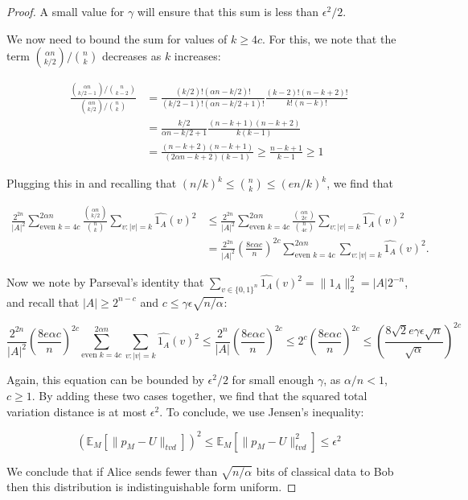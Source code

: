 \documentclass[a4paper]{article}
\begin{document}
\begin{proof}
        A small value for $\gamma$ will ensure that this sum is less than $\epsilon^2/2$.

        We now need to bound the sum for values of $k \geq 4c$. For this, we note that the term $\binom{\alpha n}{k/2}/\binom{n}{k}$ decreases as $k$ increases:

        \begin{align*}
            \frac{\binom{\alpha n}{k/2 - 1}/\binom{n}{k-2}}{\binom{\alpha n}{k/2}/\binom{n}{k}} &= \frac{(k/2)!(\alpha n - k/2)!}{(k/2 - 1)!(\alpha n - k/2 + 1)!}\frac{(k-2)!(n-k + 2)!}{k!(n-k)!}\\
            &= \frac{k/2}{\alpha n - k/2 + 1}\frac{(n - k + 1)(n - k + 2)}{k(k - 1)}\\
            &= \frac{(n - k + 2)(n - k + 1)}{(2\alpha n - k + 2)(k - 1)} \geq \frac{n - k + 1}{k - 1} \geq 1
        \end{align*}

        Plugging this in and recalling that $(n/k)^k \leq \binom{n}{k} \leq (en/k)^k$, we find that

        \begin{align*}
            \frac{2^{2n}}{|A|^2}\sum_{\textrm{even }k=4c}^{2\alpha n}\frac{\binom{\alpha n}{k/2}}{\binom{n}{k}}\sum_{v:|v| = k}\widehat{1_A}(v)^2 &\leq \frac{2^{2n}}{|A|^2}\sum_{\textrm{even }k=4c}^{2\alpha n}\frac{\binom{\alpha n}{2c}}{\binom{n}{4c}}\sum_{v:|v| = k}\widehat{1_A}(v)^2\\
            &= \frac{2^{2n}}{|A|^2}\left(\frac{8 e\alpha c}{n}\right)^{2c}\sum_{\textrm{even }k=4c}^{2\alpha n}\sum_{v:|v| = k}\widehat{1_A}(v)^2.
        \end{align*}

        Now we note by Parseval's identity that $\sum_{v \in \{0, 1\}^n}\widehat{1_A}(v)^2 = \|1_A\|_2^2 = |A|2^{-n}$, and recall that $|A| \geq 2^{n-c}$ and $c \leq \gamma \epsilon \sqrt{n/\alpha}$:

        $$\frac{2^{2n}}{|A|^2}\left(\frac{8 e\alpha c}{n}\right)^{2c}\sum_{\textrm{even }k=4c}^{2\alpha n}\sum_{v:|v| = k}\widehat{1_A}(v)^2 \leq \frac{2^n}{|A|}\left(\frac{8 e\alpha c}{n}\right)^{2c} \leq 2^c\left(\frac{8 e\alpha c}{n}\right)^{2c} \leq \left(\frac{8\sqrt{2} e\gamma\epsilon\sqrt{n}}{\sqrt{\alpha}}\right)^{2c}$$

        Again, this equation can be bounded by $\epsilon^2/2$ for small enough $\gamma$, as $\alpha/n < 1$, $c \geq 1$. By adding these two cases together, we find that the squared total variation distance is at most $\epsilon^2$. To conclude, we use Jensen's inequality:

        $$(\mathbb{E}_M[\|p_M - U\|_{tvd}])^2 \leq \mathbb{E}_M[\|p_M - U\|_{tvd}^2] \leq \epsilon^2$$

        We conclude that if Alice sends fewer than $\sqrt{n/\alpha}$ bits of classical data to Bob then this distribution is indistinguishable form uniform.
        \end{proof}
\end{document}
